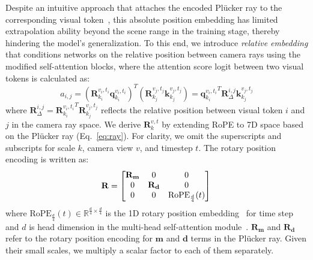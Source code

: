 Despite an intuitive approach that attaches the encoded Pl\"ucker ray to the corresponding visual token~\cite{jin2024lvsm,chen2024unimlvg}, this absolute position embedding has limited extrapolation ability beyond the scene range in the training stage, thereby hindering the model's generalization. To this end, we introduce \textit{relative embedding} that conditions networks on the relative position between camera rays using the modified self-attention blocks, where the attention score logit between two visual tokens is calculated as:
\begin{equation}
    a_{i,j}=\left(\mathbf{R}_{k_i}^{v_i,t_i}\mathbf{q}_{k_i}^{v_i,t_i}\right)^T\left(\mathbf{R}_{k_j}^{v_j,t_j}\mathbf{k}_{k_j}^{v_j,t_j}\right)={\mathbf{q}_{k_i}^{v_i,t_i}}^T\mathbf{R}_{\Delta}^{i,j}\mathbf{k}_{k_j}^{v_j,t_j}
    \label{eq:rope}
\end{equation}
where $\mathbf{R}_{\Delta}^{i,j}={\mathbf{R}_{k_i}^{v_i,t_i}}^T\mathbf{R}_{k_j}^{v_j,t_j}$ reflects the relative position between visual token $i$ and $j$ in the camera ray space. We derive $\mathbf{R}_{k}^{v,t}$ by extending RoPE to 7D space based on the Pl\"ucker ray (Eq.~\ref{eq:ray}). For clarity, we omit the superscripts and subscripts for scale $k$, camera view $v$, and timestep $t$. The rotary position encoding is written as:
\begin{equation}
    \mathbf{R}=\left[\begin{matrix}
        \mathbf{R_m} & 0 & 0\\
        0 & \mathbf{R_d} & 0\\
        0 & 0 & \text{RoPE}_{\frac{d}{4}}(t)
    \end{matrix}\right]\\
\end{equation}
where $\text{RoPE}_{\frac{d}{4}}(t)\in\mathbb{R}^{\frac{d}{4}\times\frac{d}{4}}$ is the 1D rotary position embedding~\cite{su2024roformer} for time step and $d$ is head dimension in the multi-head self-attention module~\cite{vaswani2017attention}. $\mathbf{R_m}$ and $\mathbf{R_d}$ refer to the rotary position encoding for $\mathbf{m}$ and $\mathbf{d}$ terms in the Pl\"ucker ray. Given their small scales, we multiply a scalar factor to each of them separately.
